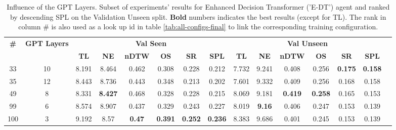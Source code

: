 \begin{table}
\centering
\caption{\label{tab:e_dt_layers}Influence of the GPT Layers. Subset of experiments' results for Enhanced Decision Transformer ('E-DT') agent and ranked by descending SPL on the Validation Unseen split. \textbf{Bold} numbers indicates the best results (except for TL). The rank in column \# is also used as a look up id in table \ref{tab:all-configs-final} to link the corresponding training configuration.}
\begin{tabular}{@{\hskip3pt}c@{\hskip3pt}c@{\hskip3pt}c@{\hskip3pt}c@{\hskip3pt}c@{\hskip3pt}c@{\hskip3pt}c@{\hskip3pt}c@{\hskip3pt}c@{\hskip3pt}c@{\hskip3pt}c@{\hskip3pt}c@{\hskip3pt}c@{\hskip3pt}c@{\hskip3pt}c}
\toprule
                                  \textbf{\#} & \textbf{GPT Layers} & \multicolumn{6}{c}{\textbf{Val Seen}} & \multicolumn{6}{c}{\textbf{Val Unseen}} \\
\cmidrule(l){3-8}\cmidrule(l){9-14}\textbf{~} &          \textbf{~} &       \textbf{TL} &     \textbf{NE} &  \textbf{nDTW} &     \textbf{OS} &     \textbf{SR} &    \textbf{SPL} &         \textbf{TL} &    \textbf{NE} &   \textbf{nDTW} &     \textbf{OS} &     \textbf{SR} &    \textbf{SPL} \\
\midrule
                                           33 &                  10 &             8.191 &           8.464 &          0.462 &           0.308 &           0.228 &           0.212 &               7.732 &          9.241 &           0.408 &           0.256 &  \textbf{0.175} &  \textbf{0.158} \\
                                           35 &                  12 &             8.443 &           8.736 &          0.443 &           0.348 &           0.213 &           0.202 &               7.601 &          9.332 &           0.409 &           0.256 &           0.168 &           0.158 \\
                                           49 &                   8 &             8.331 &  \textbf{8.427} &          0.468 &           0.328 &           0.228 &           0.215 &               8.069 &          9.181 &  \textbf{0.419} &  \textbf{0.258} &           0.165 &           0.153 \\
                                           99 &                   6 &             8.574 &           8.907 &          0.437 &           0.329 &           0.243 &           0.227 &               8.019 &  \textbf{9.16} &           0.406 &           0.247 &           0.153 &           0.139 \\
                                          100 &                   3 &             9.192 &            8.57 &  \textbf{0.47} &  \textbf{0.391} &  \textbf{0.252} &  \textbf{0.236} &               8.383 &          9.686 &           0.401 &           0.245 &           0.153 &           0.139 \\
\bottomrule
\end{tabular}
\end{table}

